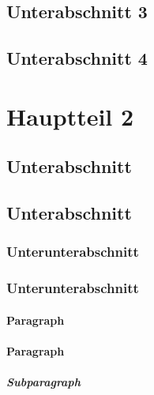 \subsection{Unterabschnitt 3}
\Blindtext\Blindtext
\subsection{Unterabschnitt 4}
\Blindtext\Blindtext

\section{Hauptteil 2}

\subsection{Unterabschnitt}
\blindtext
\subsection{Unterabschnitt}
\blindtext
\subsubsection{Unterunterabschnitt}
\blindtext
\subsubsection{Unterunterabschnitt}
\blindtext
\paragraph{Paragraph}
\blindtext
\paragraph{Paragraph}
\blindtext
\subparagraph{Subparagraph}
\blindtext